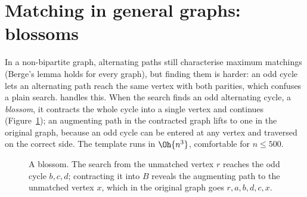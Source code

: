 \section[Matching in general graphs]{Matching in general graphs: blossoms \hfill \ioi}\label{sec:blossom}

In a non-bipartite graph, alternating paths still characterise maximum matchings (Berge's lemma holds for every graph), but finding
them is harder: an odd cycle lets an alternating path reach the same vertex with both parities, which confuses a plain search.
 handles this. When the search finds an odd alternating cycle, a \emph{blossom}, it contracts the
whole cycle into a single vertex and continues (Figure~\ref{fig:blossom}); an augmenting path in the contracted graph lifts to one
in the original graph, because an odd cycle can be entered at any vertex and traversed on the correct side. The template runs in
$\Oh{n^3}$, comfortable for $n \le 500$.

\begin{figure}[htbp]
\centering
{}
\caption{A blossom. The search from the unmatched vertex $r$ reaches the odd cycle $b, c, d$; contracting it into $B$ reveals the
augmenting path to the unmatched vertex $x$, which in the original graph goes $r, a, b, d, c, x$.}
\label{fig:blossom}
\end{figure}

